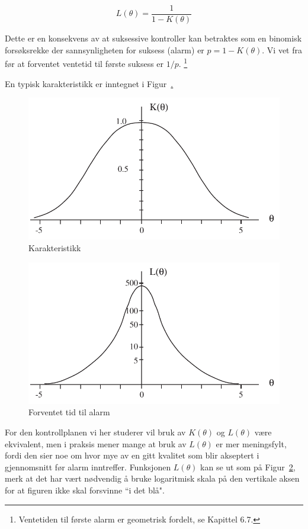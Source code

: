 \[  L(\theta )=\frac{1}{1-K(\theta )}                   \]

\noindent Dette er en konsekvens av at suksessive kontroller kan betraktes
som en binomisk forsøksrekke der sannsynligheten for suksess (alarm) er
$p = 1 - K(\theta)$.  Vi vet fra før at forventet ventetid til
første suksess er $1/p$.  \footnote{Ventetiden til første 
alarm er geometrisk fordelt, se Kapittel 6.7.}

En typisk karakteristikk er inntegnet i Figur~\href{Karakteristikk}.

\begin{figure}[ht]
\centering
	\includegraphics[scale=1.0]{figurer/fig15_3.pdf} 
\caption{Karakteristikk}
	\label{fig:karakteristikk2}
\end{figure}

\begin{figure}[ht]
\centering
	\includegraphics[scale=1.0]{figurer/fig15_4.pdf} 
\caption{Forventet tid til alarm}
	\label{fig:alarm}
\end{figure}

For den kontrollplanen vi her studerer vil bruk av $K(\theta)$ og
$L(\theta)$ være ekvivalent, men i praksis mener mange at bruk av
$L(\theta)$ er mer meningsfylt, fordi den sier noe om hvor mye av en
gitt kvalitet som blir akseptert i gjennomsnitt før alarm inntreffer.
Funksjonen $L(\theta)$ kan se ut som på Figur~\ref{fig:alarm}, merk at det har 
vært nødvendig å bruke logaritmisk skala på den vertikale
aksen for at figuren ikke skal forsvinne ``i det blå".


